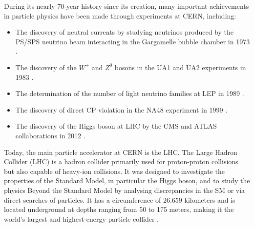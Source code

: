 During its nearly 70-year history since its creation, many important achievements in particle physics have been made through experiments at CERN, including:
\begin{itemize}
    \setlength\itemsep{0em}
    \item The discovery of neutral currents by studying neutrinos produced by the PS/SPS neutrino beam interacting in the Gargamelle bubble chamber in 1973 \cite{GargamelleNeutrino:1973jyy}.
    \item The discovery of the $W^\pm$ and $Z^0$ bosons in the UA1 and UA2 experiments in 1983 \cite{UA1:1983crd, UA2:1983tsx}.
    \item The determination of the number of light neutrino families at LEP in 1989 \cite{ALEPH:1989kcj}.
    \item The discovery of direct CP violation in the NA48 experiment in 1999 \cite{NA48:1999szy}.
    \item The discovery of the Higgs boson at LHC by the CMS and ATLAS collaborations in 2012 \cite{CMS:2012qbp,ATLAS:2012yve}.
\end{itemize}

Today, the main particle accelerator at CERN is the LHC. The Large Hadron Collider (LHC) is a hadron collider primarily used for proton-proton collisions but also capable of heavy-ion collisions. It was designed to investigate the properties of the Standard Model, in particular the Higgs boson, and to study the physics Beyond the Standard Model by analysing discrepancies in the SM or via direct searches of particles. It has a circumference of 26.659 kilometers and is located underground at depths ranging from 50 to 175 meters, making it the world's largest and highest-energy particle collider \cite{Evans:2008zzb, CERN:Facts_figures}.

